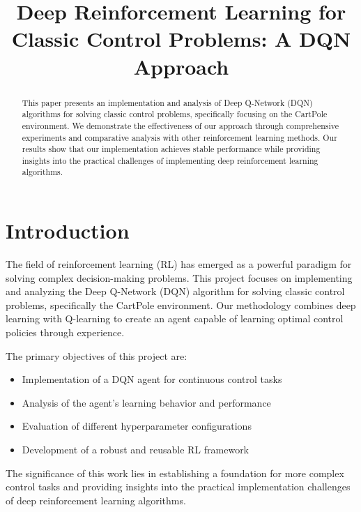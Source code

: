 \documentclass[conference]{IEEEtran}
\begin{document}
\title{Deep Reinforcement Learning for Classic Control Problems: A DQN Approach}

\author{
}

\maketitle

\begin{abstract}
This paper presents an implementation and analysis of Deep Q-Network (DQN) algorithms for solving classic control problems, specifically focusing on the CartPole environment. We demonstrate the effectiveness of our approach through comprehensive experiments and comparative analysis with other reinforcement learning methods. Our results show that our implementation achieves stable performance while providing insights into the practical challenges of implementing deep reinforcement learning algorithms.
\end{abstract}

\section{Introduction}
The field of reinforcement learning (RL) has emerged as a powerful paradigm for solving complex decision-making problems. This project focuses on implementing and analyzing the Deep Q-Network (DQN) algorithm for solving classic control problems, specifically the CartPole environment. Our methodology combines deep learning with Q-learning to create an agent capable of learning optimal control policies through experience.

The primary objectives of this project are:
\begin{itemize}
    \item Implementation of a DQN agent for continuous control tasks
    \item Analysis of the agent's learning behavior and performance
    \item Evaluation of different hyperparameter configurations
    \item Development of a robust and reusable RL framework
\end{itemize}

The significance of this work lies in establishing a foundation for more complex control tasks and providing insights into the practical implementation challenges of deep reinforcement learning algorithms.
\end{document}
